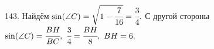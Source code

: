 143. Найдём $\sin(\angle C)=\sqrt{1-\cfrac{7}{16}}=\cfrac{3}{4}.$ С другой стороны $\sin(\angle C)=\cfrac{BH}{BC},\ \cfrac{3}{4}=\cfrac{BH}{8},\ BH=6.$ \\
